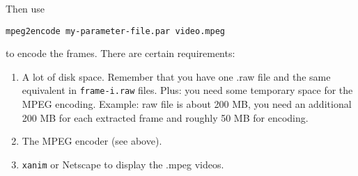 \documentclass{article}
\begin{document}
Then use 
\begin{center}
  \texttt{mpeg2encode my-parameter-file.par video.mpeg}  
\end{center}

to encode the frames. There are certain requirements: 

\begin{enumerate}
  
\item A lot of disk space. Remember that you have one .raw file and the same
  equivalent in \texttt{frame-i.raw} files. Plus: you need some temporary
  space for the MPEG encoding. Example: raw file is about 200 MB, you need an
  additional 200 MB for each extracted frame and roughly 50 MB for encoding.

\item The MPEG encoder (see above).

\item \texttt{xanim} or Netscape to display the .mpeg videos. 

\end{enumerate}
\end{document}
